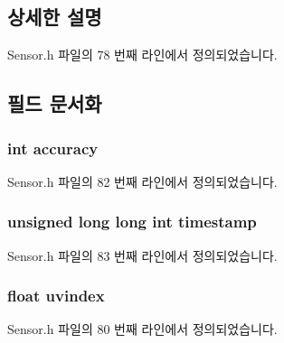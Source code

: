 \subsection{상세한 설명}


Sensor.\-h 파일의 78 번째 라인에서 정의되었습니다.



\subsection{필드 문서화}
\hypertarget{struct__UltraViolet__data_a5565cf9073275f9713f9016e7c10d25f}{
\subsubsection[{accuracy}]{\setlength{\rightskip}{0pt plus 5cm}int accuracy}}\label{struct__UltraViolet__data_a5565cf9073275f9713f9016e7c10d25f}


Sensor.\-h 파일의 82 번째 라인에서 정의되었습니다.

\hypertarget{struct__UltraViolet__data_a8de02c4128636a7bf630ff5428f60c8d}{
\subsubsection[{timestamp}]{\setlength{\rightskip}{0pt plus 5cm}unsigned long long int timestamp}}\label{struct__UltraViolet__data_a8de02c4128636a7bf630ff5428f60c8d}


Sensor.\-h 파일의 83 번째 라인에서 정의되었습니다.

\hypertarget{struct__UltraViolet__data_a46f441c4177376452cb467caa0b7fa46}{
\subsubsection[{uvindex}]{\setlength{\rightskip}{0pt plus 5cm}float uvindex}}\label{struct__UltraViolet__data_a46f441c4177376452cb467caa0b7fa46}


Sensor.\-h 파일의 80 번째 라인에서 정의되었습니다.

